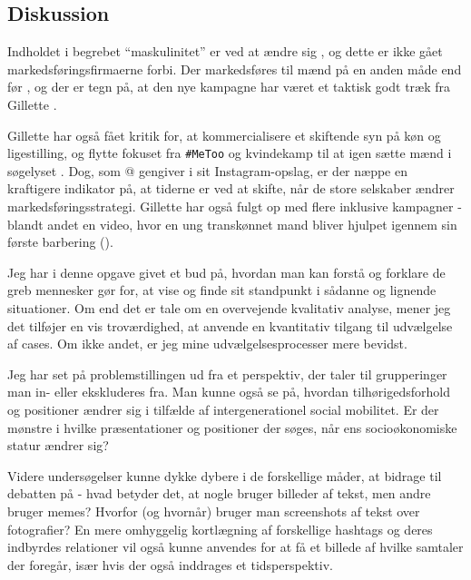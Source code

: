 \subsection{Diskussion}

Indholdet i begrebet “maskulinitet” er ved at ændre sig 
\autocite{gilpinBoysMenTeaching2018}, og dette er ikke gået 
markedsføringsfirmaerne forbi.  Der markedsføres til mænd på en 
anden måde end før \autocite{smithMeTooChangedWay2018}, og der er 
tegn på, at den nye kampagne har været et taktisk godt træk fra 
Gillette \autocite{commetricGilletteAdControversy2019}.

Gillette har også fået kritik for, at kommercialisere et skiftende 
syn på køn og ligestilling, og flytte fokuset fra \texttt{\#MeToo} 
og kvindekamp til at igen sætte mænd i søgelyset 
\autocite{bergmanCelebratedNewGillette2019}. Dog, som 
@\citeauthor{elle_sciencekitty2019} gengiver i sit 
Instagram-opslag, er der næppe en kraftigere indikator på, at 
tiderne er ved at skifte, når de store selskaber ændrer 
markedsføringsstrategi. Gillette har også fulgt op med flere 
inklusive kampagner - blandt andet en video, hvor en ung 
transkønnet mand bliver hjulpet igennem sin første barbering 
(\citeyear{gilletteFirstShaveStory2019}).

Jeg har i denne opgave givet et bud på, hvordan man kan forstå og 
forklare de greb mennesker gør for, at vise og finde sit 
standpunkt i sådanne og lignende situationer. Om end det er tale 
om en overvejende kvalitativ analyse, mener jeg det tilføjer en 
vis troværdighed, at anvende en kvantitativ tilgang til udvælgelse 
af cases. Om ikke andet, er jeg mine udvælgelsesprocesser mere 
bevidst.

Jeg har set på problemstillingen ud fra et perspektiv, der taler 
til grupperinger man in- eller ekskluderes fra. Man kunne også se 
på, hvordan tilhørigedsforhold og positioner ændrer sig i tilfælde 
af intergenerationel social mobilitet. Er der mønstre i hvilke 
præsentationer og positioner der søges, når ens socioøkonomiske 
statur ændrer sig?

Videre undersøgelser kunne dykke dybere i de forskellige måder, at 
bidrage til debatten på - hvad betyder det, at nogle bruger 
billeder af tekst, men andre bruger memes? Hvorfor (og hvornår) 
bruger man screenshots af tekst over fotografier? En mere 
omhyggelig kortlægning af forskellige hashtags og deres indbyrdes 
relationer vil også kunne anvendes for at få et billede af hvilke 
samtaler der foregår, især hvis der også inddrages et 
tidsperspektiv.

